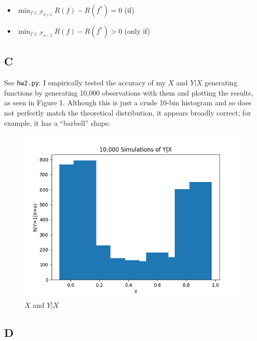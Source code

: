 \documentclass{report}
\begin{document}
\begin{itemize}
	\item $\min_{f \in \mathcal{F}_{d \geq 2}} R(f) - R(f^*) = 0$ \qquad (if)
	\item $\min_{f \in \mathcal{F}_{d<2}} R(f) - R(f^*) > 0$ \qquad (only
		if)
\end{itemize}

\newpage

\subsection*{C}

See \texttt{hw2.py}. I empirically tested the accuracy of my $X$ and $Y|X$
generating functions by generating 10,000 observations with them and plotting the results,
as seen in Figure 1. Although this is just a crude 10-bin histogram 
and so does not perfectly match the theoretical distribution, it appears broadly
correct; for example, it has a ``barbell'' shape.

\begin{figure}[h]
	\caption{$X$ and $Y|X$}
	\centering
	\includegraphics[scale=0.5]{hist}
\end{figure}

\subsection*{D}
\end{document}
